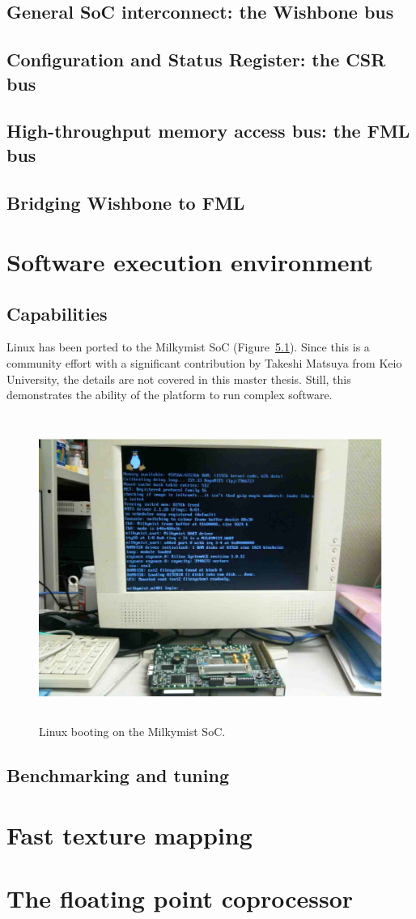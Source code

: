 \documentclass[a4paper,11pt]{kthesis}
\begin{document}
\section{General SoC interconnect: the Wishbone bus}
\section{Configuration and Status Register: the CSR bus}
\section{High-throughput memory access bus: the FML bus}
\section{Bridging Wishbone to FML}

\chapter{Software execution environment}
\section{Capabilities}
Linux has been ported to the Milkymist SoC (Figure~\ref{fig:linux}). Since this is a community effort with a significant contribution by Takeshi Matsuya from Keio University, the details are not covered in this master thesis. Still, this demonstrates the ability of the platform to run complex software.

\begin{figure}[htp]
\centering
\includegraphics[height=100mm]{linux.eps}
\caption{Linux booting on the Milkymist SoC.}
\label{fig:linux}
\end{figure}

\section{Benchmarking and tuning}

\chapter{Fast texture mapping}
\label{ch:tmu}

\chapter{The floating point coprocessor}

{}

\end{document}
